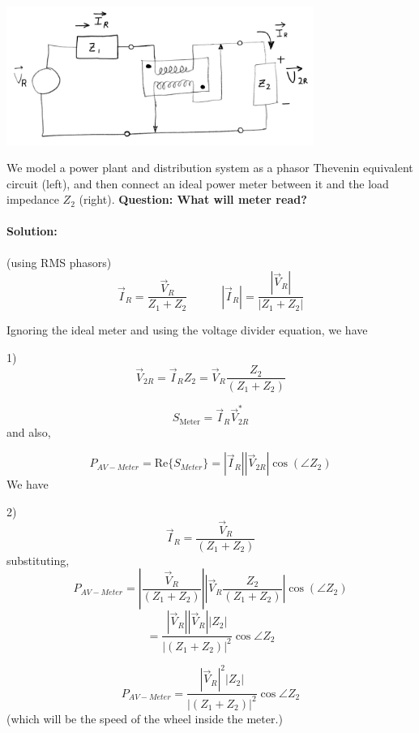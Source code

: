 \begin{ExampleSmall}

\includegraphics[width=100mm]{figsChapt03/GD42554.png}

We model a power plant and distribution system as a phasor Thevenin equivalent
circuit (left), and then connect an ideal power meter between it and the load impedance $Z_2$
(right). \textbf{Question: What will meter read?}
\end{ExampleSmall}
\begin{ExampleCont}
\paragraph{Solution:} (using RMS phasors)
\[
\vec{I}_R = \frac{\vec{V}_R}{Z_1 + Z_2} \quad\quad\quad |\vec{I}_R| = \frac{|\vec{V}_R|}{| {Z}_1 +  {Z}_2|}
\]

Ignoring the ideal meter and using the voltage divider equation, we have

\hspace {1.75in} 1)
\[
\vec{V}_{2R} = \vec{I}_R Z_2 = \vec V_R \frac{Z_2}{(Z_1 + Z_2)}
\]


\[
S_{\text{Meter}} = \vec{I}_R\vec{V}_{2R}^*
\]
and also,

\[
P_{AV-Meter} = \mathrm{Re} \{S_{Meter}\} = |\vec I_R||\vec V_{2R}|\cos(\angle Z_2)
\]
We have


\hspace {1.75in} 2)
\[
\vec I_R = \frac {\vec V_{R}} {(Z_1+Z_2)}
\]
substituting,
\[
P_{AV-Meter} = \left |   \frac {\vec V_{R}}   {(Z_1+Z_2)}   \right |
\left | \vec V_R \frac{Z_2}{(Z_1 + Z_2)} \right | \cos(\angle Z_2)
\]
\[
= \frac{|\vec{V}_R| |\vec{V}_R| |Z_2|}
       {|(Z_1 + Z_2)|^2} \cos \angle Z_2
\]

\[\boxed{
P_{AV-Meter} = \frac{|\vec{V}_R|^2 |Z_2|}
                    {|(Z_1 + Z_2)|^2} \cos \angle Z_2
}
\]
(which will be the speed of the wheel inside the meter.)

\end{ExampleCont}










